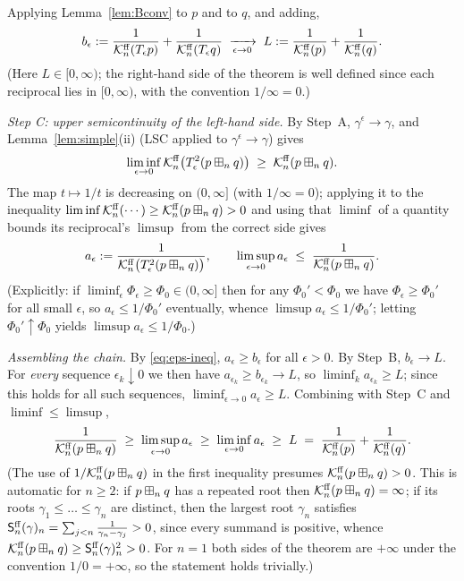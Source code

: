 \medskip
Applying Lemma~\ref{lem:Bconv} to $p$ and to $q$, and adding,
\[
b_\epsilon:=\frac{1}{\mathcal{K}^{\mathrm{ff}}_n(T_\epsilon p)}+\frac{1}{\mathcal{K}^{\mathrm{ff}}_n(T_\epsilon q)}
\;\xrightarrow[\epsilon\to0]{}\;
L:=\frac{1}{\mathcal{K}^{\mathrm{ff}}_n(p)}+\frac{1}{\mathcal{K}^{\mathrm{ff}}_n(q)} .
\]
(Here $L\in[0,\infty)$; the right-hand side of the theorem is well defined since
each reciprocal lies in $[0,\infty)$, with the convention $1/\infty=0$.)

\medskip
\noindent\textit{Step C: upper semicontinuity of the left-hand side.}
By Step~A, $\gamma^\epsilon\to\gamma$, and Lemma~\ref{lem:simple}(ii) (LSC applied
to $\gamma^\epsilon\to\gamma$) gives
\[
\liminf_{\epsilon\to 0}\mathcal{K}^{\mathrm{ff}}_n\bigl(T_\epsilon^2(p\boxplus_n q)\bigr)\;\ge\;\mathcal{K}^{\mathrm{ff}}_n(p\boxplus_n q).
\]
The map $t\mapsto 1/t$ is decreasing on $(0,\infty]$ (with $1/\infty=0$); applying
it to the inequality $\liminf \mathcal{K}^{\mathrm{ff}}_n(\cdots)\ge\mathcal{K}^{\mathrm{ff}}_n(p\boxplus_n q)>0$ and
using that $\liminf$ of a quantity bounds its reciprocal's $\limsup$ from the
correct side gives
\[
a_\epsilon:=\frac{1}{\mathcal{K}^{\mathrm{ff}}_n\bigl(T_\epsilon^2(p\boxplus_n q)\bigr)},\qquad
\limsup_{\epsilon\to 0}a_\epsilon\;\le\;\frac{1}{\mathcal{K}^{\mathrm{ff}}_n(p\boxplus_n q)}.
\]
(Explicitly: if $\liminf_\epsilon\Phi_\epsilon\ge\Phi_0\in(0,\infty]$ then for any
$\Phi_0'<\Phi_0$ we have $\Phi_\epsilon\ge\Phi_0'$ for all small $\epsilon$, so
$a_\epsilon\le 1/\Phi_0'$ eventually, whence $\limsup a_\epsilon\le 1/\Phi_0'$;
letting $\Phi_0'\uparrow\Phi_0$ yields $\limsup a_\epsilon\le 1/\Phi_0$.)

\medskip
\noindent\textit{Assembling the chain.}
By \eqref{eq:eps-ineq}, $a_\epsilon\ge b_\epsilon$ for all $\epsilon>0$. By Step~B,
$b_\epsilon\to L$. For \emph{every} sequence $\epsilon_k\downarrow 0$ we then have
$a_{\epsilon_k}\ge b_{\epsilon_k}\to L$, so $\liminf_{k}a_{\epsilon_k}\ge L$;
since this holds for all such sequences, $\liminf_{\epsilon\to0}a_\epsilon\ge L$.
Combining with Step~C and $\liminf\le\limsup$,
\[
\frac{1}{\mathcal{K}^{\mathrm{ff}}_n(p\boxplus_n q)}
\;\ge\;\limsup_{\epsilon\to 0}a_\epsilon
\;\ge\;\liminf_{\epsilon\to 0}a_\epsilon
\;\ge\;L
\;=\;\frac{1}{\mathcal{K}^{\mathrm{ff}}_n(p)}+\frac{1}{\mathcal{K}^{\mathrm{ff}}_n(q)}.
\]
(The use of $1/\mathcal{K}^{\mathrm{ff}}_n(p\boxplus_n q)$ in the first inequality presumes
$\mathcal{K}^{\mathrm{ff}}_n(p\boxplus_n q)>0$. This is automatic for $n\ge 2$: if $p\boxplus_n q$ has
a repeated root then $\mathcal{K}^{\mathrm{ff}}_n(p\boxplus_n q)=\infty$; if its roots
$\gamma_1\le\dots\le\gamma_n$ are distinct, then the largest root $\gamma_n$
satisfies $\mathsf{S}^{\mathrm{ff}}_n(\gamma)_n=\sum_{j<n}\frac{1}{\gamma_n-\gamma_j}>0$, since
every summand is positive, whence $\mathcal{K}^{\mathrm{ff}}_n(p\boxplus_n q)\ge\mathsf{S}^{\mathrm{ff}}_n(\gamma)_n^2>0$.
For $n=1$ both sides of the theorem are $+\infty$ under the convention $1/0=+\infty$,
so the statement holds trivially.)

